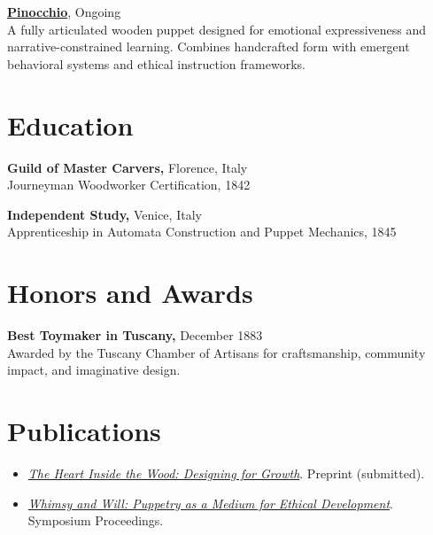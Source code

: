 \documentclass[10pt]{article}
\begin{document}
\textbf{\href{https://en.wikipedia.org/wiki/Pinocchio}{Pinocchio}}, \hfill Ongoing \\
A fully articulated wooden puppet designed for emotional expressiveness and narrative-constrained learning.
Combines handcrafted form with emergent behavioral systems and ethical instruction frameworks.
 \\
\vspace{0.3em}


\section*{Education}

\textbf{Guild of Master Carvers, } \hfill Florence, Italy \\
Journeyman Woodworker Certification, \hfill 1842
\vspace{0.3em}

\textbf{Independent Study, } \hfill Venice, Italy \\
Apprenticeship in Automata Construction and Puppet Mechanics, \hfill 1845
\vspace{0.3em}


\section*{Honors and Awards}

\textbf{Best Toymaker in Tuscany,} \hfill December 1883 \\
Awarded by the Tuscany Chamber of Artisans for craftsmanship, community impact, and imaginative design.
\vspace{0.3em}


\section*{Publications}
\begin{itemize}[leftmargin=*, noitemsep, topsep=0.1em]

    \item \textit{\href{}{The Heart Inside the Wood: Designing for Growth}}. Preprint (submitted).

    \item \textit{\href{}{Whimsy and Will: Puppetry as a Medium for Ethical Development}}. Symposium Proceedings.

\end{itemize}
\end{document}
